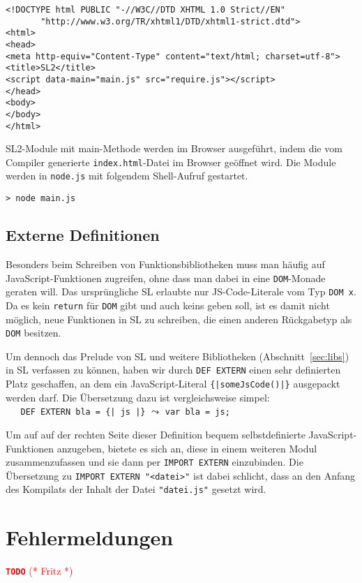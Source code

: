 \documentclass[runningheads]{llncs}
\newcommand{\TODO}[1]{ \textcolor{red}{\textbf{\texttt{\large{TODO}}} (* #1 *)}\par}
\begin{document}
\begin{verbatim}
<!DOCTYPE html PUBLIC "-//W3C//DTD XHTML 1.0 Strict//EN"
       "http://www.w3.org/TR/xhtml1/DTD/xhtml1-strict.dtd">
<html>
<head>
<meta http-equiv="Content-Type" content="text/html; charset=utf-8">
<title>SL2</title>
<script data-main="main.js" src="require.js"></script>
</head>
<body>
</body>
</html>
\end{verbatim}

SL2-Module mit main-Methode werden im Browser ausgeführt, indem die
vom Compiler generierte \texttt{index.html}-Datei im Browser geöffnet
wird. Die Module werden in \texttt{node.js} mit folgendem Shell-Aufruf
gestartet.

\begin{verbatim}
> node main.js
\end{verbatim}

\subsection{Externe Definitionen}

Besonders beim Schreiben von Funktionsbibliotheken muss man häufig auf
Java\-Script-Funktionen zugreifen, ohne dass man dabei in eine
\verb|DOM|-Monade geraten will. Das ursprüngliche SL erlaubte nur
JS-Code-Literale vom Typ \verb|DOM x|. Da es kein \verb|return| für
\verb|DOM| gibt und auch keins geben soll, ist es damit nicht möglich,
neue Funktionen in SL zu schreiben, die einen anderen Rückgabetyp als
\verb|DOM| besitzen.

Um dennoch das Prelude von SL und weitere Bibliotheken (Abschnitt~\ref{sec:libs})
in SL verfassen zu können, haben wir durch \verb|DEF EXTERN| einen sehr
definierten Platz geschaffen, an dem ein Java\-Script-Literal
\verb.{|someJsCode()|}. ausgepackt werden darf. Die Übersetzung dazu ist
vergleichsweise simpel:\\
\verb.   DEF EXTERN bla = {| js |}.
\quad $\leadsto$ \quad \verb|var bla = js;|

Um auf auf der rechten Seite dieser Definition bequem selbstdefinierte
Java\-Script-Funktionen anzugeben, bietete es sich an, diese in einem
weiteren Modul zusammenzufassen und sie dann per \verb|IMPORT EXTERN|
einzubinden. Die Übersetzung zu \verb|IMPORT EXTERN "<datei>"| ist dabei
schlicht, dass an den Anfang des Kompilats der Inhalt der Datei
\verb|"datei.js"| gesetzt wird.

\section{Fehlermeldungen}
\label{sec:errors}
\TODO{Fritz}
\end{document}
